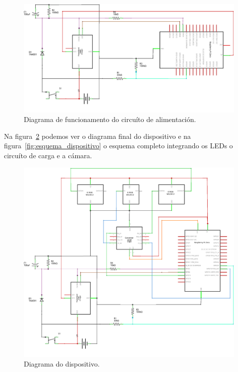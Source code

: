 \begin{itemize}
    \begin{figure}[tbp]
      \centering
    	\includegraphics[scale=1]{imaxes/circuito-bateria.png}
    	\caption{Diagrama de funcionamento do circuíto de alimentación.}
    	\label{fig:circuito_alimentacion}
    \end{figure}

    Na figura~\ref{fig:circuito_dispositivo} podemos ver o diagrama final do dispositivo e na figura~\ref{fig:esquema_dispositivo} o esquema completo integrando os LEDs o circuíto de carga e a cámara.

    \begin{figure}[tbp]
      \centering
    	\includegraphics[scale=1]{imaxes/circuito-completo.png}
    	\caption{Diagrama do dispositivo.}
    	\label{fig:circuito_dispositivo}
    \end{figure}


\end{itemize}
